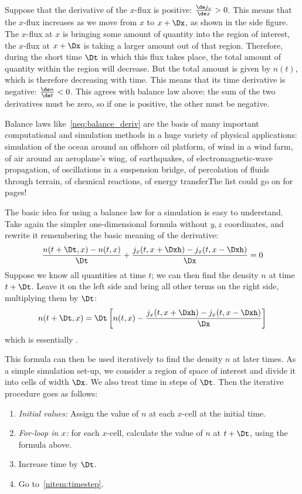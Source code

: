 Suppose that the derivative of the $x$-flux is positive: $\frac{\de j_{x}}{\de x} > 0$. This means that the $x$-flux increases as we move from $x$ to $x+\Dx$, as shown in the side figure. The $x$-flux at $x$ is bringing some amount of quantity into the region of interest, the $x$-flux at  $x+\Dx$ is taking a larger amount out of that region. Therefore, during the short time $\Dt$ in which this flux takes place, the total amount of quantity within the region will decrease. But the total amount is given by $n(t)$, which is therefore decreasing with time. This means that its time derivative is negative: $\frac{\de n}{\de t} < 0$. This agrees with balance law above: the sum of the two derivatives must be zero, so if one is positive, the other must be negative.

\medskip

Balance laws like~\eqref{neq:balance_deriv} are the basis of many important computational and simulation methods in a huge variety of physical applications: simulation of the ocean around an offshore oil platform, of wind in a wind farm, of air around an aeroplane's wing, of earthquakes, of electromagnetic-wave propagation, of oscillations in a suspension bridge, of percolation of fluids through terrain, of chemical reactions, of energy transfer\textellipsis The list could go on for pages!

The basic idea for using a balance law for a simulation is easy to understand. Take again the simpler one-dimensional formula without $y,z$ coordinates, and rewrite it remembering the basic meaning of the derivative:
\begin{equation*}
  \frac{n(t+\Dt,x)-n(t,x)}{\Dt} + \frac{j_{x}(t, x+\Dxh)-j_{x}(t,x-\Dxh)}{\Dx} = 0
\end{equation*}
Suppose we know all quantities at time $t$; we can then find the density $n$ at time $t+\Dt$. Leave it on the left side and bring all other terms on the right side, multiplying them by $\Dt$:
\begin{equation*}
  n(t+\Dt,x) =
  \Dt\,\biggl[ n(t,x) - \frac{j_{x}(t, x+\Dxh)-j_{x}(t,x-\Dxh)}{\Dx} \biggr]
\end{equation*}
which is essentially .

This formula can then be used iteratively to find the density $n$ at later times. As a simple simulation set-up, we consider a region of space of interest and divide it into cells of width $\Dx$. We also treat time in steps of $\Dt$. Then the iterative procedure goes as follows:
\begin{myframe}
  \begin{enumerate}[label=\arabic*.,ref=\arabic*]
  \item \emph{Initial values:} Assign the value of $n$ at each $x$-cell at the initial time.
  \item\label{nitem:timestep} \emph{For-loop in $x$:} for each $x$-cell, calculate the value of $n$ at $t+\Dt$, using the formula above.
  \item Increase time by $\Dt$.
  \item Go to~\ref{nitem:timestep}.
  \end{enumerate}
\end{myframe}

